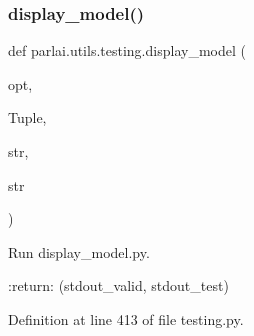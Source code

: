 \subsubsection{\texorpdfstring{display\+\_\+model()}{display\_model()}}
{\footnotesize\ttfamily def parlai.\+utils.\+testing.\+display\+\_\+model (\begin{DoxyParamCaption}\item[{}]{opt,  }\item[{}]{Tuple,  }\item[{}]{str,  }\item[{}]{str }\end{DoxyParamCaption})}

\begin{DoxyVerb}Run display_model.py.

:return: (stdout_valid, stdout_test)
\end{DoxyVerb}
 

Definition at line 413 of file testing.\+py.


